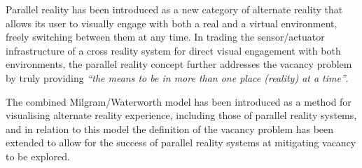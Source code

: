 Parallel reality has been introduced as a new category of alternate reality that allows its user to visually engage with both a real and a virtual environment, freely switching between them at any time. In trading the sensor/actuator infrastructure of a cross reality system for direct visual engagement with both environments, the parallel reality concept further addresses the vacancy problem by truly providing \textit{``the means to be in more than one place (reality) at a time''}\cite{Lifton2007a}.

The combined Milgram/Waterworth model has been introduced as a method for visualising alternate reality experience, including those of parallel reality systems, and in relation to this model the definition of the vacancy problem has been extended to allow for the success of parallel reality systems at mitigating vacancy to be explored.